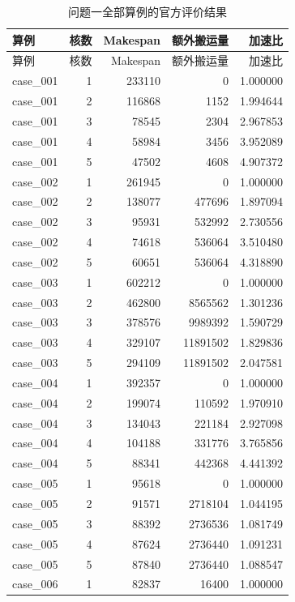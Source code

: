 \begin{longtable}{lrrrr}
\caption{问题一全部算例的官方评价结果}\\
\toprule 算例 & 核数 & Makespan & 额外搬运量 & 加速比 \\
\midrule\endfirsthead
\toprule 算例 & 核数 & Makespan & 额外搬运量 & 加速比 \\\midrule\endhead
case\_001 & 1 & 233110 & 0 & 1.000000 \\
case\_001 & 2 & 116868 & 1152 & 1.994644 \\
case\_001 & 3 & 78545 & 2304 & 2.967853 \\
case\_001 & 4 & 58984 & 3456 & 3.952089 \\
case\_001 & 5 & 47502 & 4608 & 4.907372 \\
case\_002 & 1 & 261945 & 0 & 1.000000 \\
case\_002 & 2 & 138077 & 477696 & 1.897094 \\
case\_002 & 3 & 95931 & 532992 & 2.730556 \\
case\_002 & 4 & 74618 & 536064 & 3.510480 \\
case\_002 & 5 & 60651 & 536064 & 4.318890 \\
case\_003 & 1 & 602212 & 0 & 1.000000 \\
case\_003 & 2 & 462800 & 8565562 & 1.301236 \\
case\_003 & 3 & 378576 & 9989392 & 1.590729 \\
case\_003 & 4 & 329107 & 11891502 & 1.829836 \\
case\_003 & 5 & 294109 & 11891502 & 2.047581 \\
case\_004 & 1 & 392357 & 0 & 1.000000 \\
case\_004 & 2 & 199074 & 110592 & 1.970910 \\
case\_004 & 3 & 134043 & 221184 & 2.927098 \\
case\_004 & 4 & 104188 & 331776 & 3.765856 \\
case\_004 & 5 & 88341 & 442368 & 4.441392 \\
case\_005 & 1 & 95618 & 0 & 1.000000 \\
case\_005 & 2 & 91571 & 2718104 & 1.044195 \\
case\_005 & 3 & 88392 & 2736536 & 1.081749 \\
case\_005 & 4 & 87624 & 2736440 & 1.091231 \\
case\_005 & 5 & 87840 & 2736440 & 1.088547 \\
case\_006 & 1 & 82837 & 16400 & 1.000000 \\

\end{longtable}
